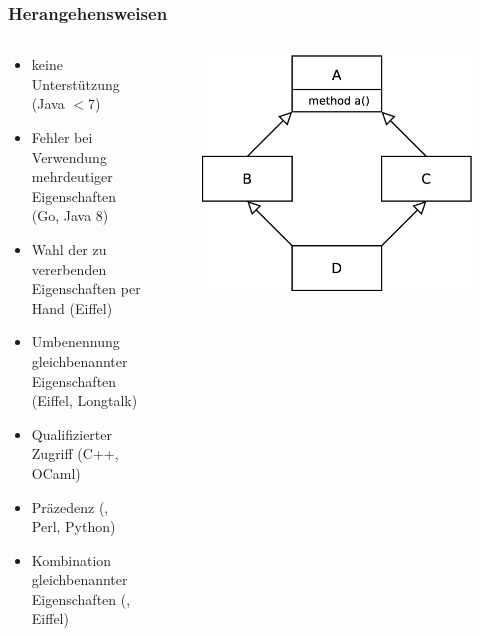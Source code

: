 \documentclass{beamer}
\begin{document}
\begin{frame}
 \frametitle{Herangehensweisen}
 \begin{columns}
  \begin{column}{0.7\textwidth}
   \begin{itemize}
    \item keine Unterstützung (Java $<$7)
    \item Fehler bei Verwendung mehrdeutiger Eigenschaften (Go, Java 8)
    \item Wahl der zu vererbenden Eigenschaften per Hand (Eiffel)
    \item Umbenennung gleichbenannter Eigenschaften (Eiffel, Longtalk)
    \item Qualifizierter Zugriff (C++, OCaml)
    \item Präzedenz (, Perl, Python)
    \item Kombination gleichbenannter Eigenschaften (, Eiffel)
   \end{itemize}
  \end{column}
 \begin{column}{0.3\textwidth}
  \begin{figure}[h]
   \centering
   \includegraphics[scale = 0.15]{pictures/diamond}
  \end{figure}
 \end{column}
 \end{columns}
\end{frame}
\end{document}
